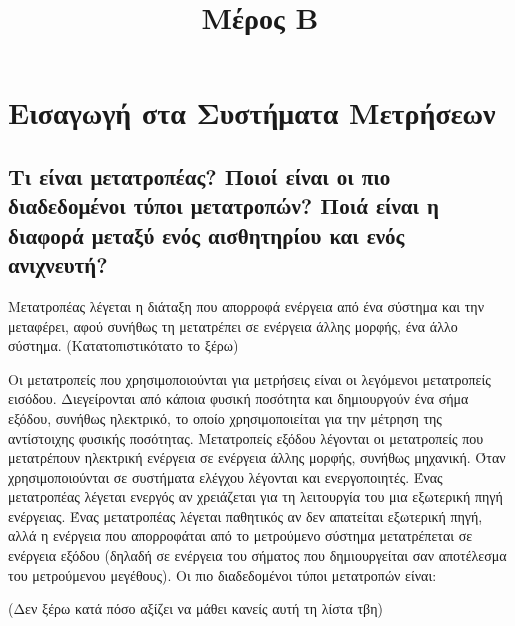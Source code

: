\documentclass{article}
\begin{document}
\title{Μέρος Β}
\author{}
\date{}

\maketitle

\section{Εισαγωγή στα Συστήματα Μετρήσεων}
\subsection{Τι είναι μετατροπέας? Ποιοί είναι οι πιο διαδεδομένοι τύποι μετατροπών? Ποιά είναι η διαφορά μεταξύ ενός αισθητηρίου και ενός ανιχνευτή?}
Μετατροπέας λέγεται η διάταξη που απορροφά ενέργεια από ένα σύστημα και την μεταφέρει, αφού συνήθως τη μετατρέπει σε ενέργεια άλλης μορφής, ένα άλλο σύστημα. (Κατατοπιστικότατο το ξέρω)

Οι μετατροπείς που χρησιμοποιούνται για μετρήσεις είναι οι λεγόμενοι μετατροπείς εισόδου. Διεγείρονται από κάποια φυσική ποσότητα και δημιουργούν ένα σήμα εξόδου, συνήθως
ηλεκτρικό, το οποίο χρησιμοποιείται για την μέτρηση της αντίστοιχης φυσικής ποσότητας. Μετατροπείς εξόδου λέγονται οι μετατροπείς που μετατρέπουν ηλεκτρική ενέργεια 
σε ενέργεια άλλης μορφής, συνήθως μηχανική. Όταν χρησιμοποιούνται σε συστήματα ελέγχου λέγονται και ενεργοποιητές. Ένας μετατροπέας λέγεται ενεργός αν χρειάζεται 
για τη λειτουργία του μια εξωτερική πηγή ενέργειας. Ένας μετατροπέας λέγεται παθητικός αν δεν απατείται εξωτερική πηγή, αλλά η ενέργεια που απορροφάται από το μετρούμενο
σύστημα μετατρέπεται σε ενέργεια εξόδου (δηλαδή σε ενέργεια του σήματος που δημιουργείται σαν αποτέλεσμα του μετρούμενου μεγέθους). Οι πιο διαδεδομένοι τύποι μετατροπών 
είναι:

(Δεν ξέρω κατά πόσο αξίζει να μάθει κανείς αυτή τη λίστα τβη)
\end{document}
